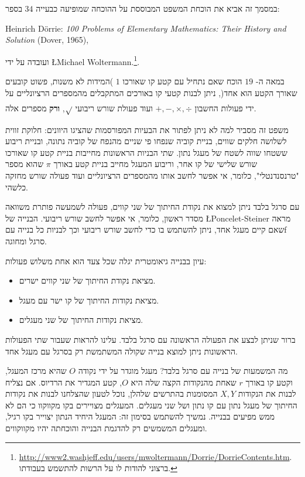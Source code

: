 \documentclass[12pt,a4paper]{article}
\begin{document}
במסמך זה אביא את הוכחת המשפט המבוססת על ההוכחה שמופיעה כבעייה
$34$
בספר:

Heinrich D\"{o}rrie: \textit{100 Problems of Elementary Mathematics: Their History and Solution} (Dover, 1965),

ועובדה על ידי
\L{Michael Woltermann}.\footnote{\url{http://www2.washjeff.edu/users/mwoltermann/Dorrie/DorrieContents.htm}.
ברצוני להודות לו על הרשות להתשמש בעבודתו.
}.



במאה ה-
$19$
הוכח שאם נתחיל עם קטע קו שאורכו 
$1$
)המידות לא משנות, פשוט קובעים שאורך הקטע הוא אחד(, ניתן לבנות קטעי קו באורכים המתקבלים מהמספרים הרציונליים על ידי פעולות החשבון 
$+,-,\times,\div$
ועוד פעולת שורש ריבועי 
$\rule[-5pt]{0pt}{20pt}\sqrt{}$,
\textbf{%
ורק%
}
מספרים אלה.

משפט זה מסביר למה לא ניתן לפתור את הבעיות המפורסמות שהציגו היוונים: חלוקת זווית לשלושה חלקים שווים, בניית קוביה שנפחו פי שניים מהנפח של קוביה נתונה, ובניית ריבוע ששטחו שווה לשטח של מעגל נתון. שתי הבניות הראשונות מחייבות בניית קטע קו שאורכו שורש שלישי של קו אחר, וריבוע המעגל מחייב בניית קטע באורך
$\pi$
שהוא מספר "טרנסנדנטלי", כלומר, אי אפשר לחשב אותו מהמספרים הרציונליים ועוד פעולה שורש מחזקה כלשהי.

עם סרגל בלבד ניתן למצוא את נקודת החיתוך של שני קווים, פעולה לשמעשה פותרת משוואה מסדר ראשון, כלומר, אי אפשר לחשב שורש ריבועי. הבנייה של
\L{Poncelet-Steiner}
מראה שאם קיים מעגל אחד, ניתן להשתמש בו כדי לחשב שורש ריבועי וכך לבניות כל בנייה עםf סרגל ומחוגה.


עיון בבנייה גיאומטרית יגלה שכל צעד הוא אחת משלוש פעולות:
\begin{itemize}
\item
מציאת נקודת החיתוך של שני קווים ישרים.
\item
מציאת נקודות החיתוך של קו ישר עם מעגל.
\item
מציאת נקודות החיתוך של שני מעגלים.
\end{itemize}
ברור שניתן לבצע את הפעולה הראשונה עם סרגל בלבד. עלינו להראות שעבור שתי הפעולות הראשונות ניתן למוצא בנייה שקולה המשתמשת רק בסרגל עם מעגל אחד.


מה המשמעות של בנייה עם סרגל בלבד? מעגל מוגדר על ידי נקודה
$O$
שהיא מרכז המעגל, וקטע קו באורך
$r$
שאחת מהנקודות הקצה שלה היא
$O$,
קטע המגדיר את הרדיוס. אם נצליח לבנות את הנקודות
$X,Y$
המסומנות בהתרשים שלהלן, נוכל לטעון שהצלחנו לבנות את נקודות החיתוך של מעגל נתון עם קו נתון ושל שני מעגלים. המעגלים מצויירים בקו מקווקוו כי הם לא ממש מפיעים בבנייה. נמשיך להשתמש בסימון זה: המעגל היחיד הנתון יצוייר בקו רגיל, ומעגלים המשמשים רק להדגמת הבנייה והוכחתה יהיו מקווקווים.
\end{document}

